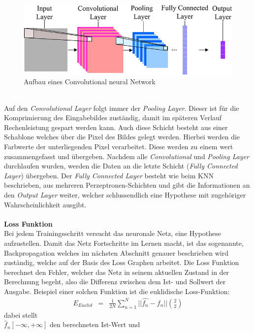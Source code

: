 \begin{figure}
	[h]
	\centering
	\includegraphics[scale=0.5]{Sources/cnnet.jpg}
	\caption{Aufbau eines Convolutional neural Network \cite{info7040061}}
	\label{img:cnn}
\end{figure}\\
Auf den \textit{Convolutional Layer} folgt immer der \textit{Pooling Layer}. Dieser ist für die Komprimierung des Eingabebildes zuständig, damit im späteren Verlauf Rechenleistung gespart werden kann. Auch diese Schicht besteht aus einer Schablone welches über die Pixel des Bildes gelegt werden. Hierbei werden die Farbwerte der unterliegenden Pixel verarbeitet. Diese werden zu einem wert zusammengefasst und übergeben. Nachdem alle \textit{Convolutional} und \textit{Pooling Layer} durchlaufen wurden, werden die Daten an die letzte Schicht (\textit{Fully Connected Layer}) übergeben. Der \textit{Fully Connected Layer} besteht wie beim KNN beschrieben, aus mehreren Perzeptronen-Schichten und gibt die Informationen an den \textit{Output Layer} weiter, welcher schlussendlich eine Hypothese mit zugehöriger Wahrscheinlichkeit ausgibt.\\\\
\textbf{Loss Funktion}\\
Bei jedem Trainingsschritt versucht das neuronale Netz, eine Hypothese aufzustellen. Damit das Netz Fortschritte im Lernen macht, ist das sogenannte, Backpropagation welches im nächsten Abschnitt genauer beschrieben wird zuständig, welche auf der Basis des Loss Graphen arbeitet. Die Loss Funktion berechnet den Fehler, welcher das Netz in seinem aktuellen Zustand in der Berechnung begeht, also die Differenz zwischen dem Ist- und Sollwert der Ausgabe. Beispiel einer solchen Funktion ist die euklidische Loss-Funktion:
\begin{eqnarray} E_{Euclid}&=&\frac{1}{2N} \sum_{n=1}^N || \hat{f_{n}}-f_{n} || \binom{2}{2} \end{eqnarray}
dabei stellt\\

	$\hat{f}_{n}[-\infty,+\infty]$ den berechneten Ist-Wert und
	
